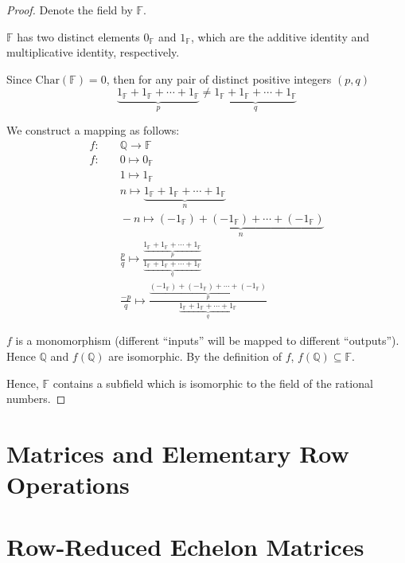 \begin{proof}
    Denote the field by $\mathbb{F}$.

    $\mathbb{F}$ has two distinct elements $0_{\mathbb{F}}$ and $1_{\mathbb{F}}$, which are the additive identity and multiplicative identity, respectively.

    Since $\text{Char}(\mathbb{F}) = 0$, then for any pair of distinct positive integers $(p, q)$
    \[
        \underbrace{1_{\mathbb{F}} + 1_{\mathbb{F}} + \cdots + 1_{\mathbb{F}}}_{p} \ne \underbrace{1_{\mathbb{F}} + 1_{\mathbb{F}} + \cdots + 1_{\mathbb{F}}}_{q}
    \]

    We construct a mapping as follows:
    \[
        \begin{split}
            f:&\quad\mathbb{Q} \to \mathbb{F} \\
            f:&\quad 0 \mapsto 0_{\mathbb{F}} \\
            &\quad 1 \mapsto 1_{\mathbb{F}} \\
            &\quad n \mapsto \underbrace{1_{\mathbb{F}} + 1_{\mathbb{F}} + \cdots + 1_{\mathbb{F}}}_{n} \\
            &\quad -n \mapsto \underbrace{(-1_{\mathbb{F}}) + (-1_{\mathbb{F}}) + \cdots + (-1_{\mathbb{F}})}_{n} \\
            &\quad \frac{p}{q} \mapsto \frac{\underbrace{1_{\mathbb{F}} + 1_{\mathbb{F}} + \cdots + 1_{\mathbb{F}}}_{p}}{\underbrace{1_{\mathbb{F}} + 1_{\mathbb{F}} + \cdots + 1_{\mathbb{F}}}_{q}} \\
            &\quad \frac{-p}{q} \mapsto \frac{\underbrace{(-1_{\mathbb{F}}) + (-1_{\mathbb{F}}) + \cdots + (-1_{\mathbb{F}})}_{p}}{\underbrace{1_{\mathbb{F}} + 1_{\mathbb{F}} + \cdots + 1_{\mathbb{F}}}_{q}}
        \end{split}
    \]

    $f$ is a monomorphism (different ``inputs'' will be mapped to different ``outputs''). Hence $\mathbb{Q}$ and $f(\mathbb{Q})$ are isomorphic. By the definition of $f$, $f(\mathbb{Q})\subseteq\mathbb{F}$.

    Hence, $\mathbb{F}$ contains a subfield which is isomorphic to the field of the rational numbers.
\end{proof}

\section{Matrices and Elementary Row Operations}

\section{Row-Reduced Echelon Matrices}

